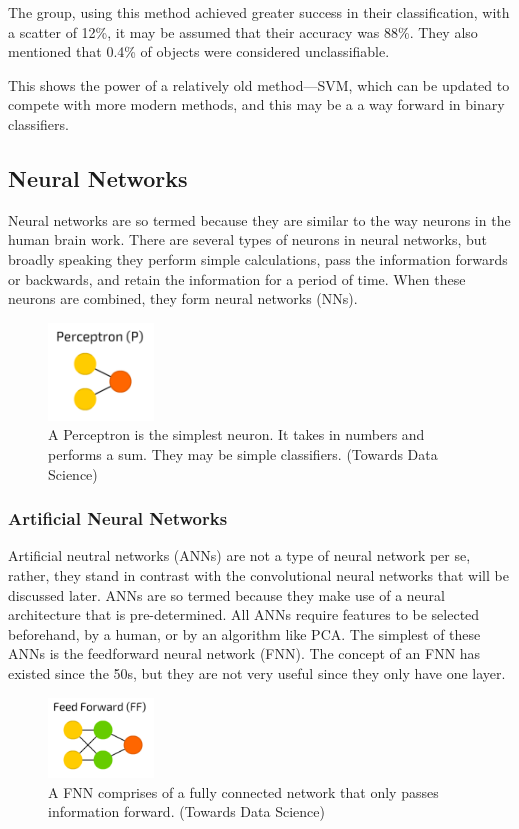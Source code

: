 \documentclass[a4paper,11pt]{article}
\begin{document}
The group, using this method achieved greater success in their classification, with a scatter of 12\%, it may be assumed that their accuracy was 88\%. They also mentioned that 0.4\% of objects were considered unclassifiable.  

This shows the power of a relatively old method—SVM, which can be updated to compete with more modern methods, and this may be a a way forward in binary classifiers.

\subsection{Neural Networks}
Neural networks are so termed because they are similar to the way neurons in the human brain work. There are several types of neurons in neural networks, but broadly speaking they perform simple calculations, pass the information forwards or backwards, and retain the information for a period of time. When these neurons are combined, they form neural networks (NNs). 
\begin{figure}[ht]
\centering
\includegraphics[width=0.25\textwidth]{Perceptron.png}
\caption{\label{fig:Perceptron}A Perceptron is the simplest neuron. It takes in numbers and performs a sum. They may be simple classifiers. (Towards Data Science)}
\end{figure}
\subsubsection{Artificial Neural Networks}
Artificial neutral networks (ANNs) are not a type of neural network per se, rather, they stand in contrast with the convolutional neural networks that will be discussed later. ANNs are so termed because they make use of a neural architecture that is pre-determined. All ANNs require features to be selected beforehand, by a human, or by an algorithm like PCA. The simplest of these ANNs is the feedforward neural network (FNN). The concept of an FNN has existed since the 50s, but they are not very useful since they only have one layer.
\begin{figure}[ht]
\centering
\includegraphics[width=0.25\textwidth]{FNN.png}
\caption{\label{fig:FNN}A FNN comprises of a fully connected network that only passes information forward. (Towards Data Science)}
\end{figure}
\end{document}
